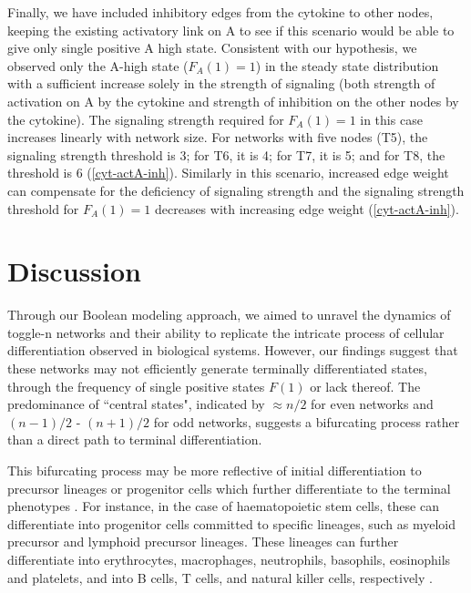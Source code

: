 \documentclass[11pt,a4paper]{article}
\theoremstyle{definition}
\theoremstyle{remark}
\begin{document}
Finally, we have included inhibitory edges from the cytokine to other nodes, keeping the existing activatory link on A to see if this scenario
would be able to give only single positive A high state. Consistent with our hypothesis, we observed only the A-high state ($F_A(1) = 1$) in the steady state distribution with a sufficient increase solely in the strength of signaling (both strength of activation on A by the cytokine and strength of inhibition on the other nodes by the cytokine). The signaling strength required for $F_A(1) = 1$ in this case increases linearly with network size. For networks with five nodes (T5), the signaling strength threshold is 3; for T6, it is 4; for T7, it is 5; and for T8, the threshold is 6 (\cref{cyt-actA-inh}). Similarly in this scenario, increased edge weight can compensate for the deficiency of signaling strength and the signaling strength threshold for $F_A(1) = 1$ decreases with increasing edge weight (\cref{cyt-actA-inh}).

\section{Discussion}

Through our Boolean modeling approach, we aimed to unravel the dynamics of toggle-n networks and their ability to replicate the intricate process of cellular differentiation observed in biological systems. However, our findings suggest that these networks may not efficiently generate terminally differentiated states, through the frequency of single positive states $F(1)$ or lack thereof. The predominance of ``central states", indicated by $\approx n/2$ for even networks and $(n-1)/2$ - $(n+1)/2$ for odd networks, suggests a bifurcating process rather than a direct path to terminal differentiation.

This bifurcating process may be more reflective of initial differentiation to precursor lineages or progenitor cells which further differentiate to the terminal phenotypes \parencite{valencia_combinatorial_2024}. For instance, in the case of haematopoietic stem cells, these can differentiate into progenitor cells committed to specific lineages, such as myeloid precursor and lymphoid precursor lineages. These lineages can further differentiate into erythrocytes, macrophages, neutrophils, basophils, eosinophils and platelets, and into B cells, T cells, and natural killer cells, respectively \parencite{laurenti_haematopoietic_2018, zhou_understanding_2011}.
\end{document}
